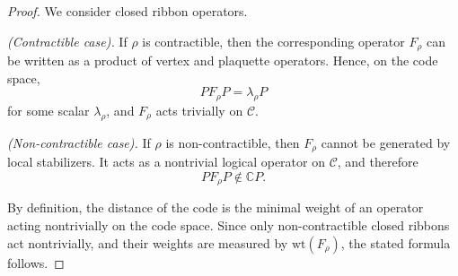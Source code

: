 \documentclass[10pt,a4paper]{amsart}
\begin{document}
\begin{proof}
We consider closed ribbon operators.

\emph{(Contractible case).}
If $\rho$ is contractible, then the corresponding operator $F_\rho$ can be written as a product of vertex and plaquette operators.
Hence, on the code space,
\[
    P F_\rho P = \lambda_\rho P
\]
for some scalar $\lambda_\rho$, and $F_\rho$ acts trivially on $\mathcal C$.

\emph{(Non-contractible case).}
If $\rho$ is non-contractible, then $F_\rho$ cannot be generated by local stabilizers.
It acts as a nontrivial logical operator on $\mathcal C$, and therefore
\[
    P F_\rho P \notin \mathbb{C}P.
\]

By definition, the distance of the code is the minimal weight of an operator acting nontrivially on the code space.
Since only non-contractible closed ribbons act nontrivially, and their weights are measured by $\mathrm{wt}(F_\rho)$, the stated formula follows.
\end{proof}
\end{document}
